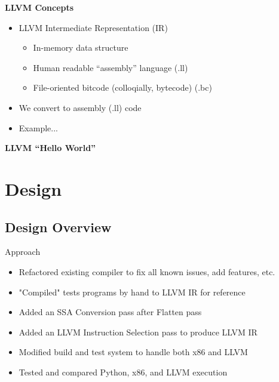 \documentclass{beamer}
\begin{document}
\begin{frame}{\bf LLVM Concepts}
  \begin{itemize}
  \item<1->LLVM Intermediate Representation (IR)
    \begin{itemize}
    \item<2->In-memory data structure
    \item<3->Human readable ``assembly'' language (.ll)
    \item<4->File-oriented bitcode (colloqially, bytecode) (.bc)
    \end{itemize}
  \item<5->We convert to assembly (.ll) code
  \item<6->Example...
  \end{itemize}
\end{frame}

\begin{frame}{\bf LLVM ``Hello World''}
  
\end{frame}

\section{Design}

\subsection{Design Overview}

\begin{frame}{Approach}
  \begin{itemize}
  \item<1->Refactored existing compiler to fix all known issues, add
    features, etc.
  \item<2->"Compiled" tests programs by hand to LLVM IR for reference
  \item<3->Added an SSA Conversion pass after Flatten pass
  \item<4->Added an LLVM Instruction Selection pass to produce LLVM IR
  \item<5->Modified build and test system to handle both x86 and LLVM
  \item<6->Tested and compared Python, x86, and LLVM execution
  \end{itemize}
\end{frame}
\end{document}
